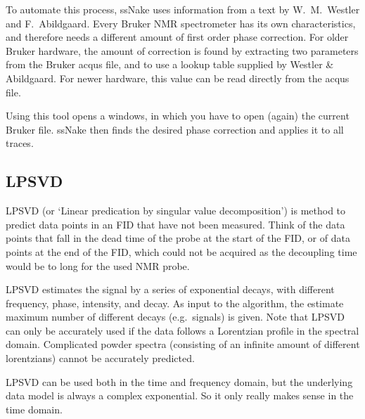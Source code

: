 \documentclass[11pt,a4paper]{article}
\begin{document}

To automate this process, ssNake uses information from a text by W.\ M.\ Westler and F.\ Abildgaard. Every Bruker NMR spectrometer has its own characteristics, and therefore needs a different amount of first order phase correction. For older Bruker hardware, the amount of correction is found by extracting two parameters from the Bruker acqus file, and to use a lookup table supplied by Westler \& Abildgaard. For newer hardware, this value can be read directly from the acqus file.

Using this tool opens a windows, in which you have to open (again) the current Bruker file. ssNake then finds the desired phase correction and applies it to all traces.

\subsection{LPSVD}
LPSVD (or `Linear predication by singular value decomposition') is method to predict data points in an FID that have not been measured. Think of the data points that fall in the dead time of the probe at the start of the FID, or of data points at the end of the FID, which could not be acquired as the decoupling time would be to long for the used NMR probe.

LPSVD estimates the signal by a series of exponential decays, with different frequency, phase, intensity, and decay. As input to the algorithm, the estimate maximum number of different decays (e.g.\ signals) is given. Note that LPSVD can only be accurately used if the data follows a Lorentzian profile in the spectral domain. Complicated powder spectra (consisting of an infinite amount of different lorentzians) cannot be accurately predicted.

LPSVD can be used both in the time and frequency domain, but the underlying data model is always a complex exponential. So it only really makes sense in the time domain.
\end{document}
